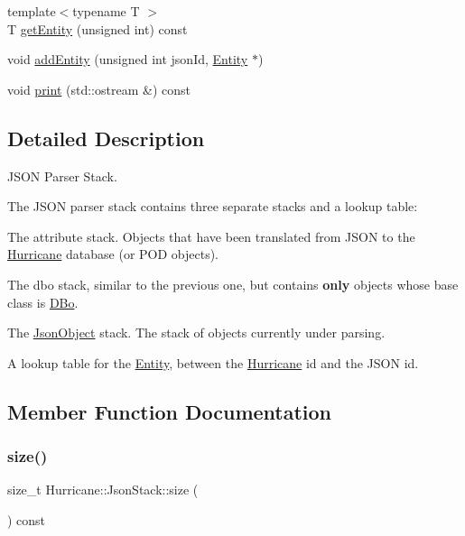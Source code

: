 \begin{DoxyCompactItemize}
\item 
{\footnotesize template$<$typename T $>$ }\\T \hyperlink{classHurricane_1_1JsonStack_aadbd70d7d19d2eb0a6c9c86ca1583c76}{get\+Entity} (unsigned int) const
\item 
void \hyperlink{classHurricane_1_1JsonStack_a421fdf4a3bab01d75f0aab292cc574d0}{add\+Entity} (unsigned int json\+Id, \hyperlink{classHurricane_1_1Entity}{Entity} $\ast$)
\item 
void \hyperlink{classHurricane_1_1JsonStack_a7e0364c8868b8396db10399a855b8aa1}{print} (std\+::ostream \&) const
\end{DoxyCompactItemize}


\subsection{Detailed Description}
J\+S\+ON Parser Stack. 

The J\+S\+ON parser stack contains three separate stacks and a lookup table\+:
\begin{DoxyEnumerate}
\item The {\ttfamily attribute} stack. Objects that have been translated from J\+S\+ON to the \hyperlink{namespaceHurricane}{Hurricane} database (or P\+OD objects).
\item The {\ttfamily dbo} stack, similar to the previous one, but contains {\bfseries only} objects whose base class is \hyperlink{classHurricane_1_1DBo}{D\+Bo}.
\item The \hyperlink{classHurricane_1_1JsonObject}{Json\+Object} stack. The stack of objects currently under parsing.
\item A lookup table for the \hyperlink{classHurricane_1_1Entity}{Entity}, between the \hyperlink{namespaceHurricane}{Hurricane} {\ttfamily id} and the J\+S\+ON {\ttfamily id}. 
\end{DoxyEnumerate}

\subsection{Member Function Documentation}
\mbox{\label{classHurricane_1_1JsonStack_a80b1e4cab1a3c4cac83491d18c76534d}} 
\subsubsection{\texorpdfstring{size()}{size()}}
{\footnotesize\ttfamily size\+\_\+t Hurricane\+::\+Json\+Stack\+::size (\begin{DoxyParamCaption}{ }\end{DoxyParamCaption}) const\hspace{0.3cm}{\ttfamily [inline]}}

